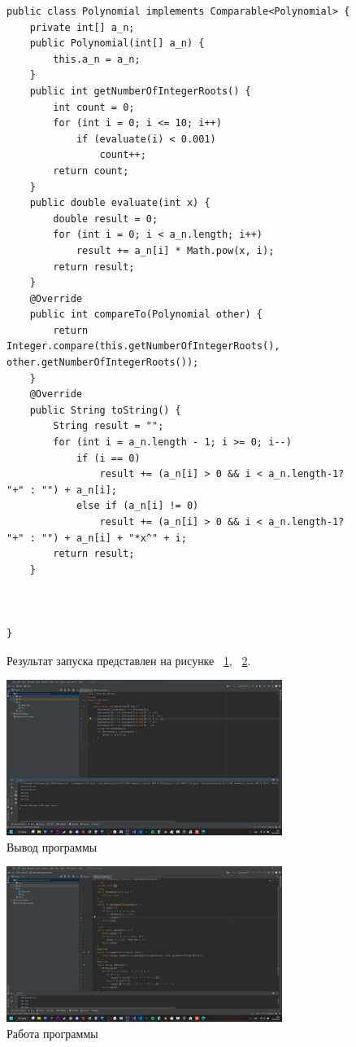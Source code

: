 \documentclass[a4paper, 14pt]{extarticle}
\begin{document}
\begin{figure}[!htb]
\begin{lstlisting}[language={},caption={класс Polynomial},label={lst:code2}]
public class Polynomial implements Comparable<Polynomial> {
    private int[] a_n;
    public Polynomial(int[] a_n) {
        this.a_n = a_n;
    }
    public int getNumberOfIntegerRoots() {
        int count = 0;
        for (int i = 0; i <= 10; i++)
            if (evaluate(i) < 0.001)
                count++;
        return count;
    }
    public double evaluate(int x) {
        double result = 0;
        for (int i = 0; i < a_n.length; i++)
            result += a_n[i] * Math.pow(x, i);
        return result;
    }
    @Override
    public int compareTo(Polynomial other) {
        return Integer.compare(this.getNumberOfIntegerRoots(), other.getNumberOfIntegerRoots());
    }
    @Override
    public String toString() {
        String result = "";
        for (int i = a_n.length - 1; i >= 0; i--)
            if (i == 0)
                result += (a_n[i] > 0 && i < a_n.length-1? "+" : "") + a_n[i];
            else if (a_n[i] != 0)
                result += (a_n[i] > 0 && i < a_n.length-1? "+" : "") + a_n[i] + "*x^" + i;
        return result;
    }



}
\end{lstlisting}
\end{figure}

\begin{figure}[!htb]
Результат запуска представлен на рисунке ~\ref{fig:picture_1.png}, ~\ref{fig:picture_2.png}.
\end{figure}

\begin{figure}[!htb]
	\centering
	\includegraphics[width=0.8\textwidth]{picture_1.png}
\caption{Вывод программы}
\label{fig:picture_1.png}
\end{figure}

\begin{figure}[!htb]
	\centering
	\includegraphics[width=0.8\textwidth]{picture_2.png}
\caption{Работа программы}
\label{fig:picture_2.png}
\end{figure}
\end{document}
